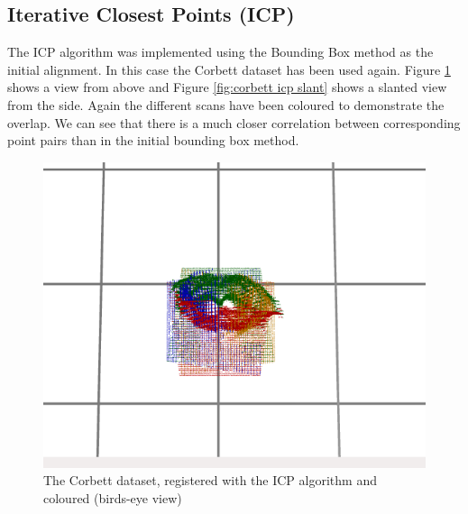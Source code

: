 \subsection{Iterative Closest Points (ICP)}
The ICP algorithm was implemented using the Bounding Box method as the initial alignment. In this case the Corbett dataset has been used again. Figure \ref{fig:corbett icp top} shows a view from above and Figure \ref{fig:corbett icp slant} shows a slanted view from the side. Again the different scans have been coloured to demonstrate the overlap. We can see that there is a much closer correlation between corresponding point pairs than in the initial bounding box method. \\

\begin{figure}[h!]
    \begin{center}
        \includegraphics[scale=0.3]{zscreenshots/corbett-icp.png}
        \caption{The Corbett dataset, registered with the ICP algorithm and coloured (birds-eye view)}
        \label{fig:corbett icp top}
    \end{center}
\end{figure} \\


